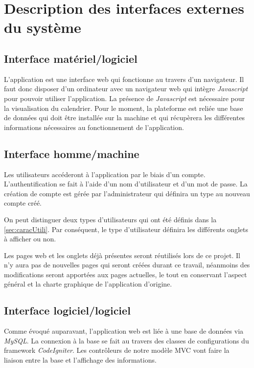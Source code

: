 \documentclass[noposter]{polytech/polytech}
\begin{document}
\section{Description des interfaces externes du système}

\subsection{Interface matériel/logiciel}

L'application est une interface web qui fonctionne au travers d'un navigateur. Il faut donc disposer d'un ordinateur avec un navigateur web qui intègre \textit{Javascript} pour pouvoir utiliser l'application. La présence de \textit{Javascript} est nécessaire pour la visualisation du calendrier. Pour le moment, la plateforme est reliée une base de données qui doit être installée sur la machine et qui récupèrera les différentes informations nécessaires au fonctionnement de l'application. 


\subsection{Interface homme/machine}

Les utilisateurs accéderont à l'application par le biais d'un compte. L'authentification se fait à l'aide d'un nom d'utilisateur et d'un mot de passe. La création de compte est gérée par l'administrateur qui définira un type au nouveau compte créé.

On peut distinguer deux types d'utilisateurs qui ont été définis dans la \autoref{sec:caracUtili}. Par conséquent, le type d'utilisateur définira les différents onglets à afficher ou non. 

Les pages web et les onglets déjà présentes seront réutilisés lors de ce projet. Il n'y aura pas de nouvelles pages qui seront créées durant ce travail, néanmoins des modifications seront apportées aux pages actuelles, le tout en conservant l'aspect général et la charte graphique de l'application d'origine. 


\subsection{Interface logiciel/logiciel}

Comme évoqué auparavant, l'application web est liée à une base de données via \textit{MySQL}. La connexion à la base se fait au travers des classes de configurations du framework \textit{CodeIgniter}. Les contrôleurs de notre modèle MVC vont faire la liaison entre la base et l'affichage des informations. 
\end{document}
